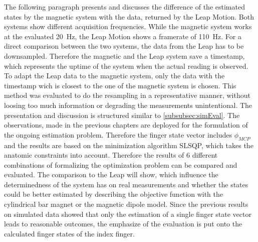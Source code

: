 The following paragraph presents and discusses the difference of the estimated states by the magnetic system with the data, returned by the Leap Motion. Both systems show different acquisition frequencies. While the magnetic system works at the evaluated \SI{20}{\Hz}, the Leap Motion shows a framerate of \SI{110}{\Hz}. For a direct comparison between the two systems, the data from the Leap has to be downsampled. Therefore the magnetic and the Leap system save a timestamp, which represents the uptime of the system when the actual reading is observed. To adapt the Leap data to the magnetic system, only the data with the timestamp wich is closest to the one of the magnetic system is chosen. This method was evaluated to do the resampling in a representative manner, without loosing too much information or degrading the measurements unintentional. 
The presentation and discussion is structured similar to \ref{subsubsec:simEval}. The observations, made in the previous chapters are deployed for the formulation of the ongoing estimation problem. Therefore the finger state vector includes $ \phi_{MCP} $ and the results are based on the minimization algorithm \ac{SLSQP}, which takes the anatomic constraints into account. Therefore the results of 6 different combinations of formalizing the optimization problem can be compared and evaluated. The comparison to the Leap will show, which influence the determinedness of the system has on real measurements and whether the states could be better estimated by describing the objective function with the cylindrical bar magnet or the magnetic dipole model. Since the previous results on simulated data showed that only the estimation of a single finger state vector leads to reasonable outcomes, the emphasize of the evaluation is put onto the calculated finger states of the index finger.


